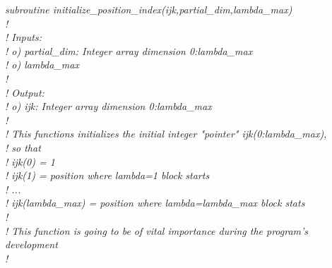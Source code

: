 \documentclass[english,twoside, openright]{report}
\begin{document}
\vbox{\em
  subroutine initialize\_position\_index(ijk,partial\_dim,lambda\_max) \\
    !\\
    ! Inputs:\\
    !        o) partial\_dim: Integer array dimension 0:lambda\_max\\
    !        o) lambda\_max\\
    !\\
    ! Output:\\
    !        o) ijk: Integer array dimension 0:lambda\_max\\
    !\\
    ! This functions initializes the initial integer "pointer" ijk(0:lambda\_max),\\
    ! so that\\
    ! ijk(0) = 1\\
    ! ijk(1) = position where lambda=1 block starts\\
    ! ...\\
    ! ijk(lambda\_max) = position where lambda=lambda\_max block stats\\
    !\\
    ! This function is going to be of vital importance during the program's development\\
    !\\
}
   
\end{document}
